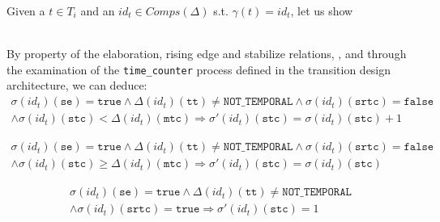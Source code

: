 \documentclass[dvipsnames,12pt]{article}
\begin{document}
\begin{niproof}
  Given a $t\in{}T_i$ and an $id_t\in{}Comps(\Delta)$ s.t. $\gamma(t)=id_t$, let us show\\
  \\

  \exT{}

  \noindent{}By property of the elaboration, \hvhdl{} rising edge and
  stabilize relations, \InCsCompT{}, and through the examination of
  the \texttt{time_counter} process defined in the transition design
  architecture, we can deduce:
  \begin{equation}
    \begin{split}
      \sigma(id_t)(\texttt{se})=\mathtt{true}\land\Delta(id_t)(\texttt{tt})\neq\mathtt{NOT\_TEMPORAL}
      \land\sigma(id_t)(\texttt{srtc})=\mathtt{false}\\
      \land\sigma(id_t)(\texttt{stc})<\Delta(id_t)(\texttt{mtc})\Rightarrow
      \sigma'(id_t)(\texttt{stc})=\sigma(id_t)(\texttt{stc})+1
    \end{split}
    \label{eq:etnrlt}
  \end{equation}

  \begin{equation}
    \begin{split}
      \sigma(id_t)(\texttt{se})=\mathtt{true}\land\Delta(id_t)(\texttt{tt})\neq\mathtt{NOT\_TEMPORAL}
      \land\sigma(id_t)(\texttt{srtc})=\mathtt{false}\\
      \land\sigma(id_t)(\texttt{stc})\ge\Delta(id_t)(\texttt{mtc})\Rightarrow
      \sigma'(id_t)(\texttt{stc})=\sigma(id_t)(\texttt{stc})
    \end{split}
    \label{eq:etnrge}
  \end{equation}

  \begin{equation}
    \begin{split}
      \sigma(id_t)(\texttt{se})=\mathtt{true}\land\Delta(id_t)(\texttt{tt})\neq\mathtt{NOT\_TEMPORAL}\\
      \land\sigma(id_t)(\texttt{srtc})=\mathtt{true}\Rightarrow
      \sigma'(id_t)(\texttt{stc})=1
    \end{split}
    \label{eq:etr}
  \end{equation}


\end{niproof}
\end{document}
